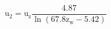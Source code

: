\documentclass[12pt]{article}
\begin{document}
\begin{displaymath}
\mathrm{u}_{2}=\mathrm{u}_{\mathrm{z}} \frac{4.87}{\ln \left(67.8 \mathrm{z}_{\mathrm{w}}-5.42\right)}
\end{displaymath}
\end{document}
